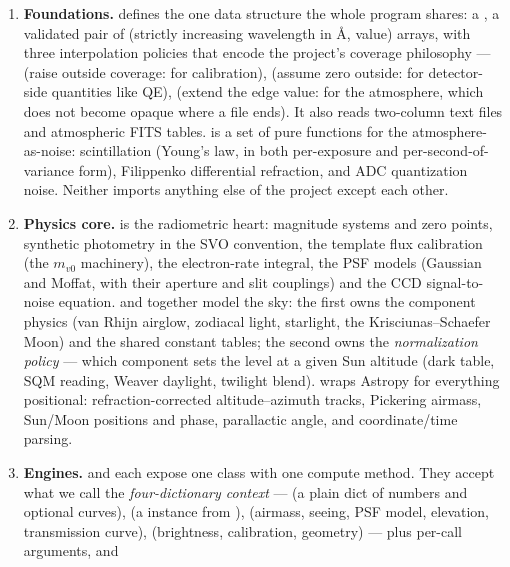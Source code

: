 \begin{enumerate}
\item \textbf{Foundations.}  defines the one
  data structure the whole program shares: a , a
  validated pair of (strictly increasing wavelength in \AA{}, value)
  arrays, with three interpolation policies that encode the project's
  coverage philosophy ---  (raise outside
  coverage: for calibration),  (assume
  zero outside: for detector-side quantities like QE),
   (extend the edge value: for the
  atmosphere, which does not become opaque where a file ends). It also
  reads two-column text files and atmospheric FITS tables.
   is a set of pure functions for the
  atmosphere-as-noise: scintillation (Young's law, in both per-exposure
  and per-second-of-variance form), Filippenko differential refraction,
  and ADC quantization noise. Neither imports anything else of the
  project except each other.
\item \textbf{Physics core.}  is the radiometric
  heart: magnitude systems and zero points, synthetic photometry in the
  SVO convention, the template flux calibration (the $m_{v0}$ machinery),
  the electron-rate integral, the PSF models (Gaussian and Moffat, with
  their aperture and slit couplings) and the CCD signal-to-noise
  equation.  and 
  together model the sky: the first owns the component physics (van
  Rhijn airglow, zodiacal light, starlight, the Krisciunas--Schaefer
  Moon) and the shared constant tables; the second owns the
  \emph{normalization policy} --- which component sets the level at a
  given Sun altitude (dark table, SQM reading, Weaver daylight, twilight
  blend).  wraps Astropy for everything positional:
  refraction-corrected altitude--azimuth tracks, Pickering airmass,
  Sun/Moon positions and phase, parallactic angle, and coordinate/time
  parsing.
\item \textbf{Engines.}  and 
  each expose one class with one compute method. They accept what we call
  the \emph{four-dictionary context} ---  (a plain dict
  of numbers and optional curves),  (a 
  instance from ),  (airmass, seeing,
  PSF model, elevation, transmission curve), 
  (brightness, calibration, geometry) --- plus per-call arguments, and

\end{enumerate}
